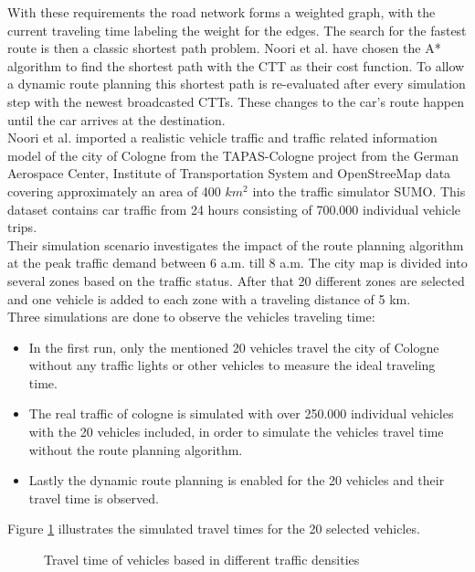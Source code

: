 \documentclass{sig-alternate}
\begin{document}
With these requirements the road network forms a weighted graph, with the current traveling time labeling the weight for the edges. The search for the fastest route is then a classic shortest path problem. Noori et al. have chosen the A* algorithm to find the shortest path with the CTT as their cost function. To allow a dynamic route planning this shortest path is re-evaluated after every simulation step with the newest broadcasted CTTs. These changes to the car's route happen until the car arrives at the destination. \\
Noori et al. imported a realistic vehicle traffic and traffic related information model of the city of Cologne from the TAPAS-Cologne project from the German Aerospace Center, Institute of Transportation System and OpenStreeMap data covering  approximately an area of 400 $km^2$ into the traffic simulator SUMO. This dataset contains car traffic from 24 hours consisting of 700.000 individual vehicle trips. \\
Their simulation scenario investigates the impact of the route planning algorithm at the peak traffic demand between 6 a.m. till 8 a.m. The city map is divided into several zones based on the traffic status. After that 20 different zones are selected and one vehicle is added to each zone with a traveling distance of 5 km. \\
Three simulations are done to observe the vehicles traveling time:
\begin{itemize}
\item In the first run, only the mentioned 20 vehicles travel the city of Cologne without any traffic lights or other vehicles to measure the ideal traveling time.
\item The real traffic of cologne is simulated with over 250.000 individual vehicles with the 20 vehicles included, in order to simulate the vehicles travel time without the route planning algorithm.
\item Lastly the dynamic route planning is enabled for the 20 vehicles and their travel time is observed. 
\end{itemize}
Figure \ref{fig:noori1} illustrates the simulated travel times for the 20 selected vehicles. 
\begin{figure} 
\centering
{}
\caption{Travel time of vehicles based in different traffic densities}
\label{fig:noori1}
\end{figure}
\end{document}
